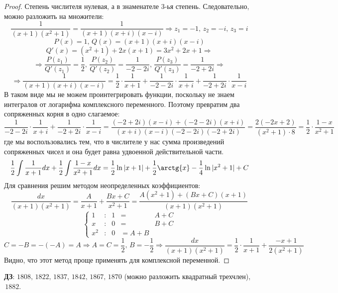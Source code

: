 \documentclass[12pt]{article}
\theoremstyle{definition}
\DeclareMathOperator{\dint}{\displaystyle\int}
\begin{document}
\begin{proof}
	Степень числителя нулевая, а в знаменателе $3$-ья степень. Следовательно, можно разложить на множители:
	$$
		\dfrac{1}{(x+ 1)(x^2+1)} = \dfrac{1}{(x + 1)(x+ i)(x -i)} \Rightarrow z_1 = -1, \, z_2 = -i, \, z_3 = i
	$$
	$$
		P(x) = 1, \, Q(x) = (x+ 1)(x + i)(x - i)
	$$
	$$	
		Q'(x) = (x^2  + 1) + 2x(x+ 1) = 3x^2 + 2x + 1 \Rightarrow
	$$
	$$
		\Rightarrow \dfrac{P(z_1)}{Q'(z_1)} = \dfrac{1}{2}, \, \dfrac{P(z_2)}{Q'(z_2)} = \dfrac{1}{-2 -2i}, \, \dfrac{P(z_3)}{Q'(z_3)} = \dfrac{1}{-2 +2i} \Rightarrow 
	$$
	$$
		\Rightarrow \dfrac{1}{(x + 1)(x+ i)(x -i)}  = \dfrac{1}{2}{\cdot}\dfrac{1}{x + 1} + \dfrac{1}{-2 -2i}{\cdot}\dfrac{1}{x + i} + \dfrac{1}{-2 + 2i}{\cdot}\dfrac{1}{x -i}
	$$
	В таком виде мы не можем проинтегрировать функции, поскольку не знаем интегралов от логарифма комплексного переменного. Поэтому превратим два сопряженных корня в одно слагаемое:
	$$
		\dfrac{1}{-2 -2i}{\cdot}\dfrac{1}{x + i} + \dfrac{1}{-2 + 2i}{\cdot}\dfrac{1}{x -i} = \dfrac{(-2+2i)(x-i) + (-2-2i)(x+i)}{(x + i)(x-i)(-2-2i)(-2 + 2i )} = \dfrac{2(-2x + 2)}{(x^2 + 1){\cdot}8} = \dfrac{1}{2}{\cdot}\dfrac{1 - x}{x^2 + 1}
	$$
	где мы воспользовались тем, что в числителе у нас сумма произведений сопряженных чисел и она будет равна удвоенной действительной части. 
	$$
		\dfrac{1}{2}\dint \dfrac{1}{x + 1}dx + \dfrac{1}{2}\dint \dfrac{1-x}{x^2 + 1}dx = \dfrac{1}{2}\ln{|x + 1|} + \dfrac{1}{2}\arctg{x}  - \dfrac{1}{4}\ln{|x^2 + 1|} + C
	$$
	Для сравнения решим методом неопределенных коэффициентов:
	$$
		\dfrac{dx}{(x + 1)(x^2 + 1)} = \dfrac{A}{x + 1} + \dfrac{Bx + C}{x^2  + 1} = \dfrac{A(x^2 + 1) + (Bx + C)(x+1)}{(x + 1)(x^2 + 1) }
	$$
	$$
		\left\{
			\begin{array}{ccccc}
				1 & \colon & 1 & = & A + C\\
				x & \colon & 0 & = & B + C\\
				x^2 & \colon & 0 & = A + B
			\end{array}
		\right.
	$$
	$$	
		C = - B = - (-A) = A \Rightarrow A = C = \dfrac{1}{2}, \, B = -\dfrac{1}{2} \Rightarrow \dfrac{dx}{(x + 1)(x^2 + 1)} = \dfrac{1}{2}{\cdot}\dfrac{1}{x+ 1} + \dfrac{-x + 1}{2( x^2 + 1)}
	$$	
	Видно, что этот метод проще применять для комплексной переменной.
\end{proof}

\textbf{ДЗ}: $1808, \, 1822, \, 1837, \, 1842, \, 1867, \, 1870$ (можно разложить квадратный трехчлен), $\, 1882$.
\end{document}
